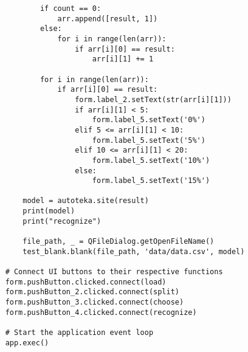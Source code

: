 \begin{lstlisting}
            if count == 0:
                arr.append([result, 1])
            else:
                for i in range(len(arr)):
                    if arr[i][0] == result:
                        arr[i][1] += 1

            for i in range(len(arr)):
                if arr[i][0] == result:
                    form.label_2.setText(str(arr[i][1]))
                    if arr[i][1] < 5:
                        form.label_5.setText('0%')
                    elif 5 <= arr[i][1] < 10:
                        form.label_5.setText('5%')
                    elif 10 <= arr[i][1] < 20:
                        form.label_5.setText('10%')
                    else:
                        form.label_5.setText('15%')
        
        model = autoteka.site(result)
        print(model)
        print("recognize")

        file_path, _ = QFileDialog.getOpenFileName()
        test_blank.blank(file_path, 'data/data.csv', model)

    # Connect UI buttons to their respective functions
    form.pushButton.clicked.connect(load)
    form.pushButton_2.clicked.connect(split)
    form.pushButton_3.clicked.connect(choose)
    form.pushButton_4.clicked.connect(recognize)

    # Start the application event loop
    app.exec()
\end{lstlisting}

